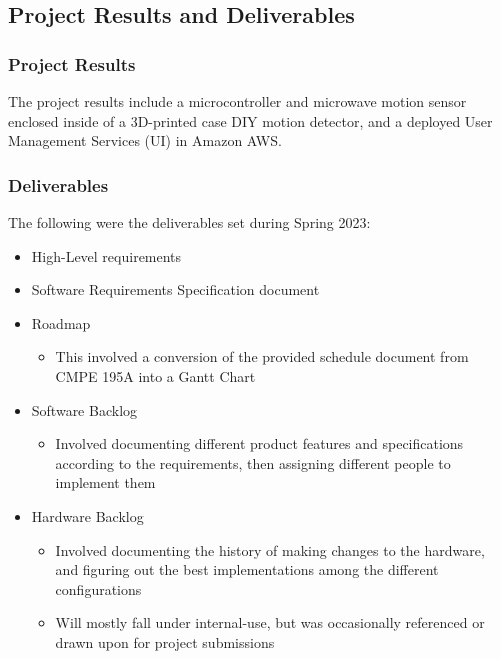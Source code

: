 \documentclass[conference]{IEEEtran}
\begin{document}
\subsection{Project Results and Deliverables}

\subsubsection{Project Results}

The project results include a microcontroller and microwave motion sensor enclosed inside of a 3D-printed case DIY motion detector, and a deployed User Management Services (UI) in Amazon AWS.

\subsubsection{Deliverables}

The following were the deliverables set during Spring 2023:
\begin{itemize}
      \item High-Level requirements
      \item Software Requirements Specification document
      \item Roadmap
            \begin{itemize}
                  \item This involved a conversion of the provided schedule document from CMPE 195A into a Gantt Chart
            \end{itemize}
      \item Software Backlog
            \begin{itemize}
                  \item Involved documenting different product features and specifications according to the requirements, then assigning different people to implement them
            \end{itemize}
      \item Hardware Backlog
            \begin{itemize}
                  \item Involved documenting the history of making changes to the hardware, and figuring out the best implementations among the different configurations
                  \item Will mostly fall under internal-use, but was occasionally referenced or drawn upon for project submissions
            \end{itemize}
\end{itemize}
\end{document}
